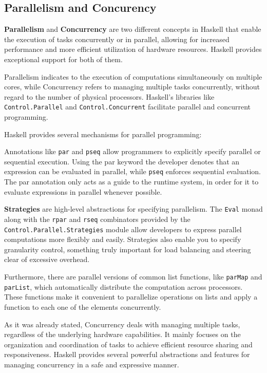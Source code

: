\documentclass[a4paper, titlepage, twoside]{article}
\begin{document}
\subsection{Parallelism and Concurency}
\label{sec:org9a750c1}

\textbf{Parallelism} and \textbf{Concurrency} are two different concepts in Haskell that enable the execution of tasks concurrently or in parallel, allowing for increased performance and more efficient utilization of hardware resources. Haskell provides exceptional support for both of them.

Parallelism indicates to the execution of computations simultaneously on multiple cores, while Concurrency refers to managing multiple tasks concurrently, without regard to the number of physical processors. Haskell's libraries like \texttt{Control.Parallel} and \texttt{Control.Concurrent} facilitate parallel and concurrent programming.

Haskell provides several mechanisms for parallel programming:

Annotations like \texttt{par} and \texttt{pseq} allow programmers to explicitly specify parallel or sequential execution. Using the par keyword the developer denotes that an expression can be evaluated in parallel, while \texttt{pseq} enforces sequential evaluation. The par annotation only acts as a guide to the runtime system, in order for it to evaluate expressions in parallel whenever possible.

\textbf{Strategies} are high-level abstractions for specifying parallelism. The \texttt{Eval} monad along with the \texttt{rpar} and \texttt{rseq} combinators provided by the \texttt{Control.Parallel.Strategies} module allow developers to express parallel computations more flexibly and easily. Strategies also enable you to specify granularity control, something truly important for load balancing and steering clear of excessive overhead.

Furthermore, there are parallel versions of common list functions, like \texttt{parMap} and \texttt{parList}, which automatically distribute the computation across processors. These functions make it convenient to parallelize operations on lists and apply a function to each one of the elements concurrently.

As it was already stated, Concurrency deals with managing multiple tasks, regardless of the underlying hardware capabilities. It mainly focuses on the organization and coordination of tasks to achieve efficient resource sharing and responsiveness. Haskell provides several powerful abstractions and features for managing concurrency in a safe and expressive manner.
\end{document}
